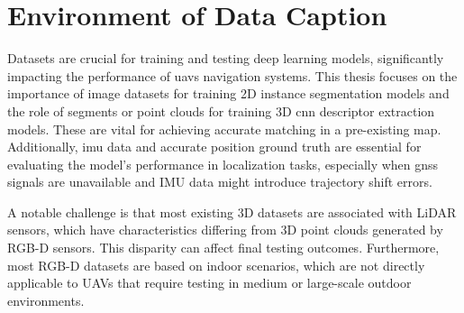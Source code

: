 \section{Environment of Data Caption}

Datasets are crucial for training and testing deep learning models, significantly impacting the performance of \acrshort{uavs} navigation systems. This thesis focuses on the importance of image datasets for training 2D instance segmentation models and the role of segments or point clouds for training 3D \acrshort{cnn} descriptor extraction models. These are vital for achieving accurate matching in a pre-existing map. Additionally, \acrshort{imu} data and accurate position ground truth are essential for evaluating the model's performance in localization tasks, especially when \acrshort{gnss} signals are unavailable and IMU data might introduce trajectory shift errors.

A notable challenge is that most existing 3D datasets are associated with LiDAR sensors, which have characteristics differing from 3D point clouds generated by RGB-D sensors. This disparity can affect final testing outcomes. Furthermore, most RGB-D datasets are based on indoor scenarios, which are not directly applicable to UAVs that require testing in medium or large-scale outdoor environments.


